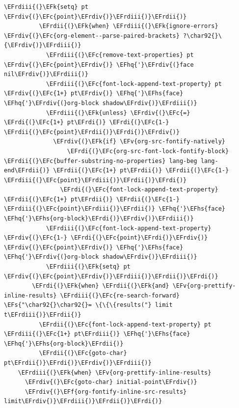 \documentclass{scrartcl}
\newcommand{\EFk}[1]{\textcolor{EFk}{#1}} %
\newcommand{\EFs}[1]{\textcolor{EFs}{#1}} %
\newcommand{\EFc}[1]{\textcolor{EFc}{#1}} %
\newcommand{\EFv}[1]{\textcolor{EFv}{#1}} %
\newcommand{\EFf}[1]{\textcolor{EFf}{#1}} %
\newcommand{\EFhq}[1]{\textcolor{EFhq}{#1}} %
\newcommand{\EFhs}[1]{\textcolor{EFhs}{#1}} %
\newcommand{\EFrdi}[1]{\textcolor{EFrdi}{#1}} %
\newcommand{\EFrdii}[1]{\textcolor{EFrdii}{#1}} %
\newcommand{\EFrdiii}[1]{\textcolor{EFrdiii}{#1}} %
\newcommand{\EFrdiv}[1]{\textcolor{EFrdiv}{#1}} %
\begin{document}
\begin{Code}
\begin{Verbatim}[]
            \EFrdiii{(}\EFk{setq} pt \EFrdiv{(}\EFc{point}\EFrdiv{)}\EFrdiii{)}\EFrdii{)}
          \EFrdii{(}\EFk{when} \EFrdiii{(}\EFk{ignore-errors} \EFrdiv{(}\EFc{org-element--parse-paired-brackets} ?\char92{}\{\EFrdiv{)}\EFrdiii{)}
            \EFrdiii{(}\EFc{remove-text-properties} pt \EFrdiv{(}\EFc{point}\EFrdiv{)} \EFhq{'}\EFrdiv{(}face nil\EFrdiv{)}\EFrdiii{)}
            \EFrdiii{(}\EFc{font-lock-append-text-property} pt \EFrdiv{(}\EFc{1+} pt\EFrdiv{)} \EFhq{'}\EFhs{face} \EFhq{'}\EFrdiv{(}org-block shadow\EFrdiv{)}\EFrdiii{)}
            \EFrdiii{(}\EFk{unless} \EFrdiv{(}\EFc{=} \EFrdi{(}\EFc{1+} pt\EFrdi{)} \EFrdi{(}\EFc{1-} \EFrdii{(}\EFc{point}\EFrdii{)}\EFrdi{)}\EFrdiv{)}
              \EFrdiv{(}\EFk{if} \EFv{org-src-fontify-natively}
                  \EFrdi{(}\EFc{org-src-font-lock-fontify-block} \EFrdii{(}\EFc{buffer-substring-no-properties} lang-beg lang-end\EFrdii{)} \EFrdii{(}\EFc{1+} pt\EFrdii{)} \EFrdii{(}\EFc{1-} \EFrdiii{(}\EFc{point}\EFrdiii{)}\EFrdii{)}\EFrdi{)}
                \EFrdi{(}\EFc{font-lock-append-text-property} \EFrdii{(}\EFc{1+} pt\EFrdii{)} \EFrdii{(}\EFc{1-} \EFrdiii{(}\EFc{point}\EFrdiii{)}\EFrdii{)} \EFhq{'}\EFhs{face} \EFhq{'}\EFhs{org-block}\EFrdi{)}\EFrdiv{)}\EFrdiii{)}
            \EFrdiii{(}\EFc{font-lock-append-text-property} \EFrdiv{(}\EFc{1-} \EFrdi{(}\EFc{point}\EFrdi{)}\EFrdiv{)} \EFrdiv{(}\EFc{point}\EFrdiv{)} \EFhq{'}\EFhs{face} \EFhq{'}\EFrdiv{(}org-block shadow\EFrdiv{)}\EFrdiii{)}
            \EFrdiii{(}\EFk{setq} pt \EFrdiv{(}\EFc{point}\EFrdiv{)}\EFrdiii{)}\EFrdii{)}\EFrdi{)}
        \EFrdi{(}\EFk{when} \EFrdii{(}\EFk{and} \EFv{org-prettify-inline-results} \EFrdiii{(}\EFc{re-search-forward} \EFs{"\char92{}\char92{}= \{\{\{results("} limit t\EFrdiii{)}\EFrdii{)}
          \EFrdii{(}\EFc{font-lock-append-text-property} pt \EFrdiii{(}\EFc{1+} pt\EFrdiii{)} \EFhq{'}\EFhs{face} \EFhq{'}\EFhs{org-block}\EFrdii{)}
          \EFrdii{(}\EFc{goto-char} pt\EFrdii{)}\EFrdi{)}\EFrdiv{)}\EFrdiii{)}
    \EFrdiii{(}\EFk{when} \EFv{org-prettify-inline-results}
      \EFrdiv{(}\EFc{goto-char} initial-point\EFrdiv{)}
      \EFrdiv{(}\EFf{org-fontify-inline-src-results} limit\EFrdiv{)}\EFrdiii{)}\EFrdii{)}\EFrdi{)}


\end{Verbatim}
\end{Code}
\end{document}
